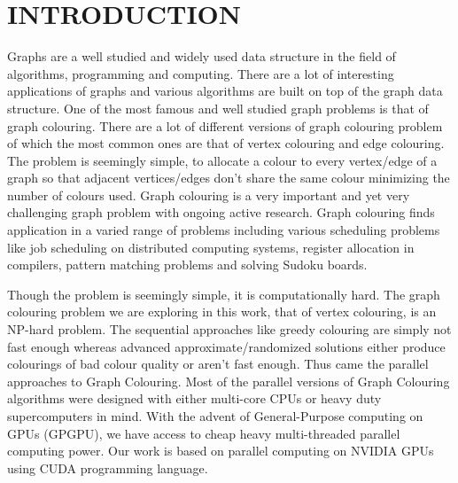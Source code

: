 \documentclass[MTech]{iitmdiss}
\begin{document}
\pagebreak
\clearpage





\chapter{INTRODUCTION}
\label{chap:intro}
Graphs are a well studied and widely used data structure in the field of algorithms, programming and computing. There are a lot of interesting applications of graphs and various algorithms are built on top of the graph data structure. One of the most famous and well studied graph problems is that of graph colouring. There are a lot of different versions of graph colouring problem of which the most common ones are that of vertex colouring and edge colouring. The problem is seemingly simple, to allocate a colour to every vertex/edge of a graph so that adjacent vertices/edges don't share the same colour minimizing the number of colours used.  
Graph colouring is a very important and yet very challenging graph problem with ongoing active research. Graph colouring finds application in a varied range of problems including various scheduling problems like job scheduling on distributed computing systems, register allocation in compilers, pattern matching problems and solving Sudoku boards.

Though the problem is seemingly simple, it is computationally hard. The graph colouring problem we are exploring in this work, that of vertex colouring, is an NP-hard problem. The sequential approaches like greedy colouring are simply not fast enough whereas advanced approximate/randomized solutions either produce colourings of bad colour quality or aren't fast enough. Thus came the parallel approaches to Graph Colouring. Most of the parallel versions of Graph Colouring algorithms were designed with either multi-core CPUs or heavy duty supercomputers in mind. With the advent of General-Purpose computing on GPUs (GPGPU), we have access to cheap heavy multi-threaded parallel computing power. Our work is based on parallel computing on NVIDIA GPUs using CUDA programming language.
\end{document}

